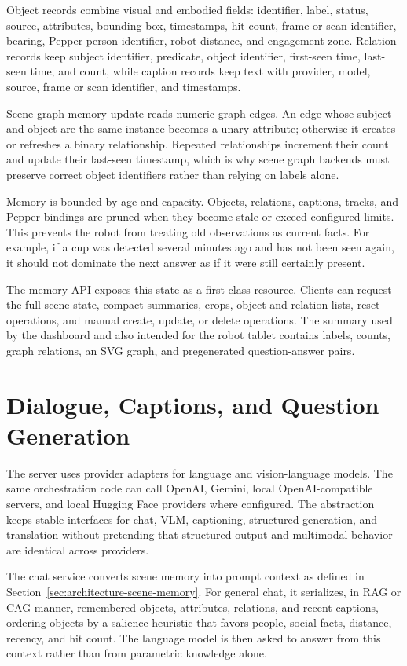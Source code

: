 Object records combine visual and embodied fields: identifier, label, status, source, attributes, bounding box, timestamps, hit count, frame or scan identifier, bearing, Pepper person identifier, robot distance, and engagement zone.
Relation records keep subject identifier, predicate, object identifier, first-seen time, last-seen time, and count, while caption records keep text with provider, model, source, frame or scan identifier, and timestamps.

Scene graph memory update reads numeric graph edges.
An edge whose subject and object are the same instance becomes a unary attribute; otherwise it creates or refreshes a binary relationship.
Repeated relationships increment their count and update their last-seen timestamp, which is why scene graph backends must preserve correct object identifiers rather than relying on labels alone.

Memory is bounded by age and capacity.
Objects, relations, captions, tracks, and Pepper bindings are pruned when they become stale or exceed configured limits.
This prevents the robot from treating old observations as current facts.
For example, if a cup was detected several minutes ago and has not been seen again, it should not dominate the next answer as if it were still certainly present.

The memory API exposes this state as a first-class resource.
Clients can request the full scene state, compact summaries, crops, object and relation lists, reset operations, and manual create, update, or delete operations.
The summary used by the dashboard and also intended for the robot tablet contains labels, counts, graph relations, an SVG graph, and pregenerated question-answer pairs.

\section{Dialogue, Captions, and Question Generation}\label{sec:server-dialogue-services}

The server uses provider adapters for language and vision-language models.
The same orchestration code can call OpenAI, Gemini, local OpenAI-compatible servers, and local Hugging Face providers where configured.
The abstraction keeps stable interfaces for chat, VLM, captioning, structured generation, and translation without pretending that structured output and multimodal behavior are identical across providers.

The chat service converts scene memory into prompt context as defined in Section~\ref{sec:architecture-scene-memory}.
For general chat, it serializes, in RAG or CAG manner, remembered objects, attributes, relations, and recent captions, ordering objects by a salience heuristic that favors people, social facts, distance, recency, and hit count.
The language model is then asked to answer from this context rather than from parametric knowledge alone.

